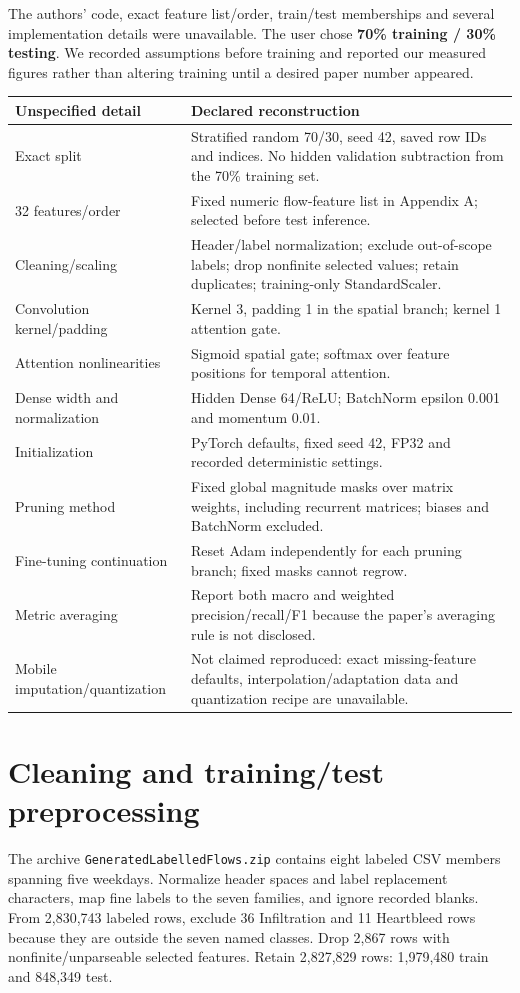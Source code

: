 \documentclass[11pt,a4paper,oneside]{report}
\newcommand{\code}[1]{\nolinkurl{#1}}
\begin{document}
The authors' code, exact feature list/order, train/test memberships and several implementation details were unavailable. The user chose \textbf{70\% training / 30\% testing}. We recorded assumptions before training and reported our measured figures rather than altering training until a desired paper number appeared.
\begin{longtable}{p{}p{}}
\toprule Unspecified detail & Declared reconstruction\\\midrule\endhead
Exact split & Stratified random 70/30, seed 42, saved row IDs and indices. No hidden validation subtraction from the 70\% training set.\\
32 features/order & Fixed numeric flow-feature list in Appendix A; selected before test inference.\\
Cleaning/scaling & Header/label normalization; exclude out-of-scope labels; drop nonfinite selected values; retain duplicates; training-only StandardScaler.\\
Convolution kernel/padding & Kernel 3, padding 1 in the spatial branch; kernel 1 attention gate.\\
Attention nonlinearities & Sigmoid spatial gate; softmax over feature positions for temporal attention.\\
Dense width and normalization & Hidden Dense 64/ReLU; BatchNorm epsilon 0.001 and momentum 0.01.\\
Initialization & PyTorch defaults, fixed seed 42, FP32 and recorded deterministic settings.\\
Pruning method & Fixed global magnitude masks over matrix weights, including recurrent matrices; biases and BatchNorm excluded.\\
Fine-tuning continuation & Reset Adam independently for each pruning branch; fixed masks cannot regrow.\\
Metric averaging & Report both macro and weighted precision/recall/F1 because the paper's averaging rule is not disclosed.\\
Mobile imputation/quantization & Not claimed reproduced: exact missing-feature defaults, interpolation/adaptation data and quantization recipe are unavailable.\\
\bottomrule
\end{longtable}

\section{Cleaning and training/test preprocessing}
The archive \code{GeneratedLabelledFlows.zip} contains eight labeled CSV members spanning five weekdays. Normalize header spaces and label replacement characters, map fine labels to the seven families, and ignore recorded blanks. From 2,830,743 labeled rows, exclude 36 Infiltration and 11 Heartbleed rows because they are outside the seven named classes. Drop 2,867 rows with nonfinite/unparseable selected features. Retain 2,827,829 rows: 1,979,480 train and 848,349 test.
\end{document}
